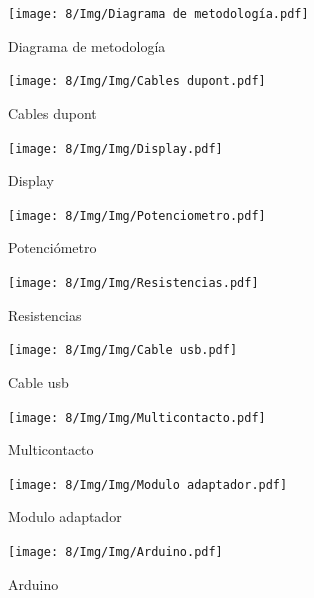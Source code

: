     \begin{figure}[H]
        \centering
        \texttt{[image: 8/Img/Diagrama de metodología.pdf]}
        \caption{Diagrama de metodología}
        \label{Diagrama de metodologia}
    \end{figure}
    
    \begin{figure}[H]
        \centering
        \texttt{[image: 8/Img/Img/Cables dupont.pdf]}
        \caption{Cables dupont}
        \label{Cables dupont}
    \end{figure}
    
    \begin{figure}[H]
        \centering
        \texttt{[image: 8/Img/Img/Display.pdf]}
        \caption{Display}
        \label{Display}
    \end{figure}
    
    \begin{figure}[H]
        \centering
        \texttt{[image: 8/Img/Img/Potenciometro.pdf]}
        \caption{Potenciómetro}
        \label{potenciometro}
    \end{figure}
    
    \begin{figure}[H]
        \centering
        \texttt{[image: 8/Img/Img/Resistencias.pdf]}
        \caption{Resistencias}
        \label{Resistencias}
    \end{figure}
    
    \begin{figure}[H]
        \centering
        \texttt{[image: 8/Img/Img/Cable usb.pdf]}
        \caption{Cable usb}
        \label{Cable usb}
    \end{figure}
    
    \begin{figure}[H]
        \centering
        \texttt{[image: 8/Img/Img/Multicontacto.pdf]}
        \caption{Multicontacto}
        \label{Multicontacto}
    \end{figure}
    
    \begin{figure}[H]
        \centering
        \texttt{[image: 8/Img/Img/Modulo adaptador.pdf]}
        \caption{Modulo adaptador}
        \label{Modulo adaptador}
    \end{figure}
    
    \begin{figure}[H]
        \centering
        \texttt{[image: 8/Img/Img/Arduino.pdf]}
        \caption{Arduino}
        \label{Arduino}
    \end{figure}
    
